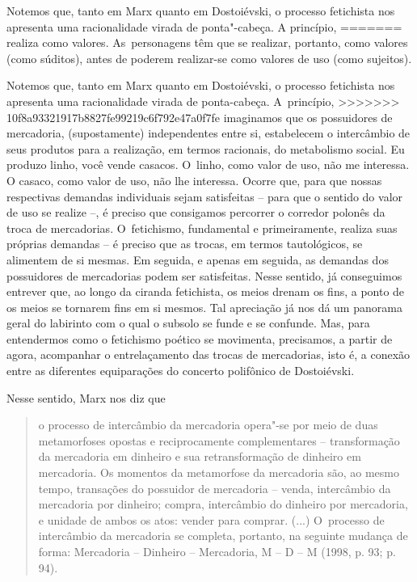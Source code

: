 {Notemos que, tanto em Marx quanto em Dostoiévski, o processo fetichista
nos apresenta uma racionalidade virada de ponta"-cabeça. A princípio,
=======
realiza como valores. As~personagens têm que se realizar, portanto, como
valores (como súditos), antes de poderem realizar-se como valores de uso
(como sujeitos).

Notemos que, tanto em Marx quanto em Dostoiévski, o processo fetichista
nos apresenta uma racionalidade virada de ponta-cabeça. A~princípio,
>>>>>>> 10f8a93321917b8827fe99219c6f792e47a0f7fe
imaginamos que os possuidores de mercadoria, (supostamente)
independentes entre si, estabelecem o intercâmbio de seus produtos para
a realização, em termos racionais, do metabolismo social. Eu produzo
linho, você vende casacos. O~linho, como valor de uso, não me interessa.
O casaco, como valor de uso, não lhe interessa. Ocorre que, para que
nossas respectivas demandas individuais sejam satisfeitas -- para que o
sentido do valor de uso se realize --, é preciso que consigamos
percorrer o corredor polonês da troca de mercadorias. O~fetichismo,
fundamental e primeiramente, realiza suas próprias demandas -- é preciso
que as trocas, em termos tautológicos, se alimentem de si mesmas. Em
seguida, e apenas em seguida, as demandas dos possuidores de mercadorias
podem ser satisfeitas. Nesse sentido, já conseguimos entrever que, ao
longo da ciranda fetichista, os meios drenam os fins, a ponto de os
meios se tornarem fins em si mesmos. Tal apreciação já nos dá um
panorama geral do labirinto com o qual o subsolo se funde e se confunde.
Mas, para entendermos como o fetichismo poético se movimenta,
precisamos, a partir de agora, acompanhar o entrelaçamento das trocas de
mercadorias, isto é, a conexão entre as diferentes equiparações do
concerto polifônico de Dostoiévski.

Nesse sentido, Marx nos diz que

\begin{quote}
o processo de intercâmbio da mercadoria opera"-se por meio de duas
metamorfoses opostas e reciprocamente complementares -- transformação da
mercadoria em dinheiro e sua retransformação de dinheiro em mercadoria.
Os momentos da metamorfose da mercadoria são, ao mesmo tempo, transações
do possuidor de mercadoria -- venda, intercâmbio da mercadoria por
dinheiro; compra, intercâmbio do dinheiro por mercadoria, e unidade de
ambos os atos: vender para comprar. (...) O~processo de intercâmbio da
mercadoria se completa, portanto, na seguinte mudança de forma:
Mercadoria -- Dinheiro -- Mercadoria, M -- D -- M (1998, p. 93; p. 94).
\end{quote}

}
